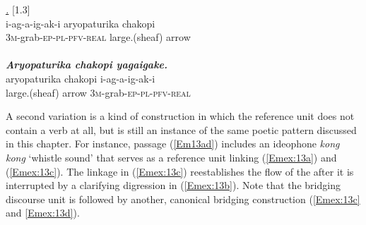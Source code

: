\documentclass[output=paper]{LSP/langsci}
\begin{document}
\begin{exe}
\ex \label{Em12ab}
\begin{xlist}
\ex \label{Emex:12a}
\glt \textit{\underline{.}} [1.3]\\
\gll i-ag-a-ig-ak-i aryopaturika chakopi\\
 \textsc{3m-}grab\textsc{-ep-pl-pfv-real} large.(sheaf) arrow\\
\glt {}\\
\ex \label{Emex:12b}
\glt \textit{\textbf{Aryopaturika chakopi yagaigake.}}\\
\gll aryopaturika chakopi i-ag-a-ig-ak-i \\     	      
   large.(sheaf) arrow \textsc{3m-}grab\textsc{-ep-pl-pfv-real}\\
\glt {}
\end{xlist}
\end{exe}

A second variation is a kind of construction in which the reference unit does not contain a verb at all, but is still an instance of the same poetic pattern discussed in this chapter. For instance, passage (\ref{Em13ad}) includes an ideophone \textit{kong kong} `whistle sound' that serves as a reference unit linking (\ref{Emex:13a}) and (\ref{Emex:13c}). The linkage in (\ref{Emex:13c}) reestablishes the flow of the  after it is interrupted by a clarifying digression in (\ref{Emex:13b}). Note that the bridging discourse unit is followed by another, canonical bridging construction (\ref{Emex:13c} and \ref{Emex:13d}).
\end{document}
